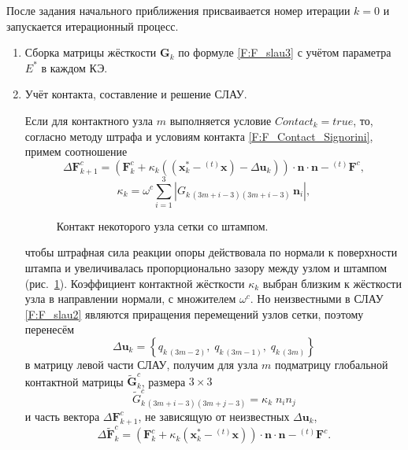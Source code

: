 \documentclass[]{article}
\begin{document}
После задания начального приближения присваивается номер итерации $k=0$ и запускается итерационный процесс.
\begin{enumerate}
	\item
	\label {itm:alg_start}
Сборка матрицы жёсткости $\mathbf{G}_k$ по формуле \eqref{F:F_slau3} с учётом параметра $E^*$ в каждом КЭ.
	\item
Учёт контакта, составление и решение СЛАУ.
	
Если для контактного узла $m$ выполняется условие $Contact_k=true$, то, согласно методу штрафа и условиям контакта \eqref{F:F_Contact_Signorini}, примем соотношение
\begin{equation}
\Delta\mathbf{F}_{k+1}^{c}=\left(\mathbf{F}_k^{c}+\kappa_k\left(\left( \mathbf{x}_k^*-{}^{(t)}\mathbf{x}\right) -\Delta\mathbf{u}_k\right)\right)\cdot\mathbf{n}\cdot\mathbf{n}-{}^{(t)}\mathbf{F}^c,
\label{F:F_algoritm_force}
\end{equation}
\begin{equation}
\kappa_k=\omega^{c}\sum_{i=1}^{3}\left| G_{k\,(3m+i-3)(3m+i-3)}\, \mathbf{n}_i \right|,
\label{F:F_algoritm_kappa}
\end{equation}
\begin{figure}
	\centering
	
	\caption{ Контакт некоторого узла сетки со штампом.}
	\label{fig:contact}
\end{figure}
чтобы штрафная сила реакции опоры действовала по нормали к поверхности штампа и увеличивалась пропорционально зазору между узлом и штампом \mbox{(рис. \ref{fig:contact})}. Коэффициент контактной жёсткости $\kappa_k$ выбран близким к жёсткости узла в направлении нормали, с множителем $\omega^{c}$. Но неизвестными в СЛАУ \eqref{F:F_slau2} являются приращения перемещений узлов сетки, поэтому перенесём
\begin{equation}
\Delta\mathbf{u}_k=\left\{ q_{k\,(3m-2)},\; q_{k\,(3m-1)},\; q_{k\,(3m)} \right\}
\label{F:F_algoritm_G_delta_u}
\end{equation}
в матрицу левой части СЛАУ, получим для узла $m$ подматрицу глобальной контактной матрицы $\tilde{\mathbf{G}}_k^c$, размера $3\times3$
\begin{equation}
\tilde{G}_{k\,(3m+i-3)(3m+j-3)}^{c}={}\kappa_{k}\;n_{i}n_{j}
\label{F:F_algoritm_G1}
\end{equation}
и часть вектора $\Delta\mathbf{F}_{k+1}^{c}$, не зависящую от неизвестных $\Delta\mathbf{u}_k$,
\begin{equation}
\Delta\tilde{\mathbf{F}}_k^c=\left(\mathbf{F}_k^c+\kappa_k\left(\mathbf{x}_k^*-{}^{(t)}\mathbf{x}\right)\right)\cdot\mathbf{n}\cdot\mathbf{n}-{}^{(t)}\mathbf{F}^c.
\label{F:F_algoritm_b1}
\end{equation}
	

\end{enumerate}
\end{document}
